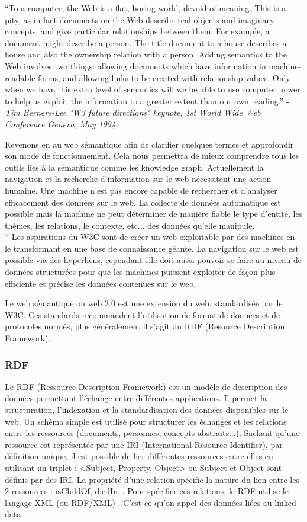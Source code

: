 \enquote{To a computer, the Web is a flat, boring world, devoid of meaning. This is a pity, as in fact documents on the Web describe real objects and imaginary concepts, and give particular relationships between them. For example, a document might describe a person. The title document to a house describes a house and also the ownership relation with a person. Adding semantics to the Web involves two things: allowing documents which have information in machine-readable forms, and allowing links to be created with relationship values. Only when we have this extra level of semantics will we be able to use computer power to help us exploit the information to a greater extent than our own reading.} - \textit{Tim Berners-Lee "W3 future directions" keynote, 1st World Wide Web Conference Geneva, May 1994} \cite{tim}

Revenons en au web sémantique afin de clarifier quelques termes et approfondir son mode de fonctionnement. Cela nous permettra de mieux comprendre tous les outils liés à la sémantique comme les knowledge graph. Actuellement la navigation et la recherche d'information sur le web nécessitent une action humaine. Une machine n'est pas encore capable de rechercher et d'analyser efficacement des données sur le web. La collecte de données automatique est possible mais la machine ne peut déterminer de manière fiable le type d'entité, les thèmes, les relations, le contexte, etc... des données qu'elle manipule.
\\*
Les aspirations du W3C sont de créer un web exploitable par des machines en le transformant en une base de connaissance géante.
La navigation sur le web est possible via des hyperliens, cependant elle doit aussi pouvoir se faire au niveau de données structurées pour que les machines puissent exploiter de façon plus efficiente et précise les données contenues sur le web.

Le web sémantique ou web 3.0 est une extension du web, standardisée par le W3C. Ces standards recommandent l'utilisation de format de données et de protocoles normés, plus généralement il s'agit du RDF (Resource Description Framework).

\subsubsection{RDF}

Le RDF (Ressource Description Framework) est un modèle de description des données permettant l'échange entre différentes applications. Il permet la structuration, l'indexation et la standardisation des données disponibles sur le web. Un schéma simple est utilisé pour structurer les échanges et les relations entre les ressources (documents, personnes, concepts abstraits...). Sachant qu'une ressource est représentée par une IRI (International Resource Identifier), par définition unique, il est possible de lier différentes ressources entre elles en utilisant un triplet : <Subject, Property, Object> ou Subject et Object sont définis par des IRI. La propriété d'une relation spécifie la nature du lien entre les 2 ressources : isChildOf, diedIn... Pour spécifier ces relations, le RDF utilise le langage XML (ou RDF/XML) \cite{rdf}. C'est ce qu'on appel des données liées au linked-data.

